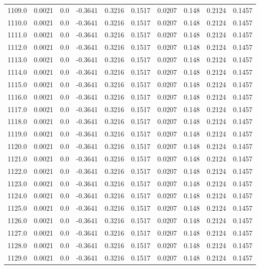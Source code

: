 \begin{longtable}{lrrrrrrrrr}
1109.0 & 0.0021 & 0.0 & -0.3641 & 0.3216 & 0.1517 & 0.0207 & 0.148 & 0.2124 & 0.1457 \\
1110.0 & 0.0021 & 0.0 & -0.3641 & 0.3216 & 0.1517 & 0.0207 & 0.148 & 0.2124 & 0.1457 \\
1111.0 & 0.0021 & 0.0 & -0.3641 & 0.3216 & 0.1517 & 0.0207 & 0.148 & 0.2124 & 0.1457 \\
1112.0 & 0.0021 & 0.0 & -0.3641 & 0.3216 & 0.1517 & 0.0207 & 0.148 & 0.2124 & 0.1457 \\
1113.0 & 0.0021 & 0.0 & -0.3641 & 0.3216 & 0.1517 & 0.0207 & 0.148 & 0.2124 & 0.1457 \\
1114.0 & 0.0021 & 0.0 & -0.3641 & 0.3216 & 0.1517 & 0.0207 & 0.148 & 0.2124 & 0.1457 \\
1115.0 & 0.0021 & 0.0 & -0.3641 & 0.3216 & 0.1517 & 0.0207 & 0.148 & 0.2124 & 0.1457 \\
1116.0 & 0.0021 & 0.0 & -0.3641 & 0.3216 & 0.1517 & 0.0207 & 0.148 & 0.2124 & 0.1457 \\
1117.0 & 0.0021 & 0.0 & -0.3641 & 0.3216 & 0.1517 & 0.0207 & 0.148 & 0.2124 & 0.1457 \\
1118.0 & 0.0021 & 0.0 & -0.3641 & 0.3216 & 0.1517 & 0.0207 & 0.148 & 0.2124 & 0.1457 \\
1119.0 & 0.0021 & 0.0 & -0.3641 & 0.3216 & 0.1517 & 0.0207 & 0.148 & 0.2124 & 0.1457 \\
1120.0 & 0.0021 & 0.0 & -0.3641 & 0.3216 & 0.1517 & 0.0207 & 0.148 & 0.2124 & 0.1457 \\
1121.0 & 0.0021 & 0.0 & -0.3641 & 0.3216 & 0.1517 & 0.0207 & 0.148 & 0.2124 & 0.1457 \\
1122.0 & 0.0021 & 0.0 & -0.3641 & 0.3216 & 0.1517 & 0.0207 & 0.148 & 0.2124 & 0.1457 \\
1123.0 & 0.0021 & 0.0 & -0.3641 & 0.3216 & 0.1517 & 0.0207 & 0.148 & 0.2124 & 0.1457 \\
1124.0 & 0.0021 & 0.0 & -0.3641 & 0.3216 & 0.1517 & 0.0207 & 0.148 & 0.2124 & 0.1457 \\
1125.0 & 0.0021 & 0.0 & -0.3641 & 0.3216 & 0.1517 & 0.0207 & 0.148 & 0.2124 & 0.1457 \\
1126.0 & 0.0021 & 0.0 & -0.3641 & 0.3216 & 0.1517 & 0.0207 & 0.148 & 0.2124 & 0.1457 \\
1127.0 & 0.0021 & 0.0 & -0.3641 & 0.3216 & 0.1517 & 0.0207 & 0.148 & 0.2124 & 0.1457 \\
1128.0 & 0.0021 & 0.0 & -0.3641 & 0.3216 & 0.1517 & 0.0207 & 0.148 & 0.2124 & 0.1457 \\
1129.0 & 0.0021 & 0.0 & -0.3641 & 0.3216 & 0.1517 & 0.0207 & 0.148 & 0.2124 & 0.1457 \\

\end{longtable}

